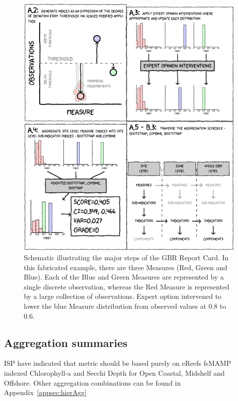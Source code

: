 \begin{figure}[h]
\includegraphics[width=\linewidth]{figures/Diagrams/schematic.pdf}
\caption{Schematic illustrating the major steps of the GBR Report Card. In this fabricated example,
there are three Measures (Red, Green and Blue).  Each of the Blue and Green Measures are represented by a single
discrete observation, whereas the Red Measure is represented by a large collection of observations.
Expert option intervened to lower the blue Measure distribution from observed values at 0.8 to 0.6.}\label{fig:schematic}
\end{figure}

\clearpage




\subsection{Aggregation summaries}

ISP have indicated that metric should be based purely on eReefs fsMAMP indexed Chlorophyll-a and Secchi Depth for Open Coastal, Midshelf and Offshore.
Other aggregation combinations can be found in Appendix~\ref{appsec:hierAgg}

